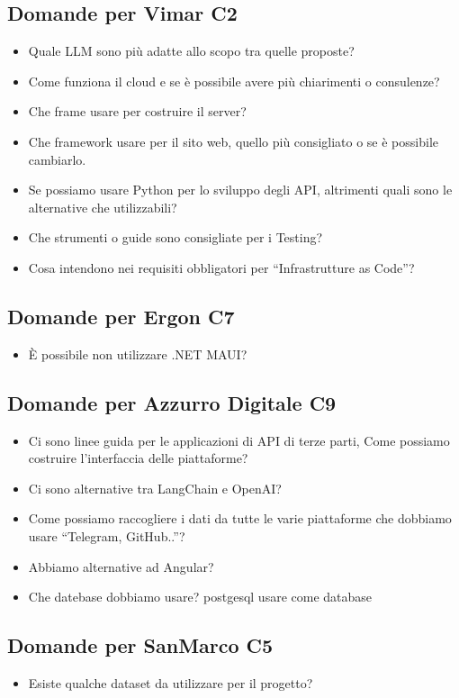 \documentclass{article}
\begin{document}
\subsection{Domande per Vimar C2}\label{subsec:domande-vimar}
\begin{itemize}
    \item Quale LLM sono più adatte allo scopo tra quelle proposte?
    \item Come funziona il cloud e se è possibile avere più chiarimenti o consulenze?
    \item Che frame usare per costruire il server?
    \item Che framework usare per il sito web, quello più consigliato o se è possibile cambiarlo.
    \item Se possiamo usare Python per lo sviluppo degli API, altrimenti quali sono le alternative che utilizzabili?
    \item Che strumenti o guide sono consigliate per i Testing?
    \item Cosa intendono nei requisiti obbligatori per “Infrastrutture as Code”?
\end{itemize}

\subsection{Domande per Ergon C7}\label{subsec:domande-ergon}
\begin{itemize}
    \item È possibile non utilizzare .NET MAUI?
\end{itemize}

\subsection{Domande per Azzurro Digitale C9}\label{subsec:domande-azzurro}
\begin{itemize}
    \item Ci sono linee guida per le applicazioni di API di terze parti, Come possiamo costruire l'interfaccia delle piattaforme?
    \item Ci sono alternative tra LangChain e OpenAI?
    \item Come possiamo raccogliere i dati da tutte le varie piattaforme che dobbiamo usare “Telegram, GitHub..”?
    \item Abbiamo alternative ad Angular? 
    \item Che datebase dobbiamo usare?  postgesql usare come database
\end{itemize}

\subsection{Domande per SanMarco C5}\label{subsec:domande-sanmarco}
\begin{itemize}
    \item Esiste qualche dataset da utilizzare per il progetto?
\end{itemize}
\end{document}
